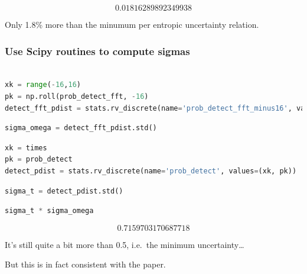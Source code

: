 \[0.01816289892349938\]

Only 1.8\% more than the minumum per entropic uncertainty relation.

\hypertarget{use-scipy-routines-to-compute-sigmas}{%
\subsubsection{Use Scipy routines to compute
sigmas}\label{use-scipy-routines-to-compute-sigmas}}

\begin{lstlisting}[language=Python]

xk = range(-16,16)
pk = np.roll(prob_detect_fft, -16)
detect_fft_pdist = stats.rv_discrete(name='prob_detect_fft_minus16', values=(xk, pk))
\end{lstlisting}

\begin{lstlisting}[language=Python]
sigma_omega = detect_fft_pdist.std()
\end{lstlisting}

\begin{lstlisting}[language=Python]
xk = times
pk = prob_detect
detect_pdist = stats.rv_discrete(name='prob_detect', values=(xk, pk))
\end{lstlisting}

\begin{lstlisting}[language=Python]
sigma_t = detect_pdist.std()
\end{lstlisting}

\begin{lstlisting}[language=Python]
sigma_t * sigma_omega
\end{lstlisting}

\[0.7159703170687718\]

It's still quite a bit more than 0.5, i.e.~the minimum
uncertainty\ldots{}

But this is in fact consistent with the paper.
